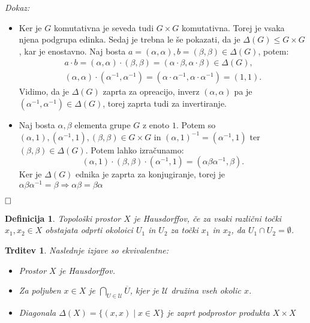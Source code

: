 \documentclass[a4paper,12pt]{article}
\def\qed{$\hfill\Box$}   %
\newtheorem{trditev}{Trditev}
\newtheorem{definicija}{Definicija}
\begin{document}
\noindent
{\em Dokaz:\/}
    \begin{itemize}
        \item[($\Rightarrow$)] Ker je $G$ komutativna je seveda tudi $G \times G$ komutativna. Torej je vsaka njena podgrupa edinka.
            Sedaj je trebna le še pokazati, da je $\Delta(G) \le G \times G$, kar je enostavno. Naj bosta $a = (\alpha, \alpha), b = (\beta, \beta) \in \Delta(G)$, potem:
            \begin{gather*}
                a \cdot b = (\alpha, \alpha) \cdot (\beta, \beta) = (\alpha \cdot \beta, \alpha \cdot \beta) \in \Delta(G), \\
                (\alpha, \alpha) \cdot (\alpha^{-1}, \alpha^{-1}) = (\alpha \cdot \alpha^{-1}, \alpha \cdot \alpha^{-1}) = (1,1).
            \end{gather*}
            Vidimo, da je $\Delta(G)$ zaprta za opreacijo, inverz $(\alpha, \alpha)$ pa je $(\alpha^{-1}, \alpha^{-1}) \in \Delta(G)$, torej zaprta tudi za invertiranje.
        \item[($\Leftarrow$)] Naj bosta $\alpha, \beta$ elementa grupe $G$ z enoto $1$.
        Potem so $(\alpha,1), (\alpha^{-1}, 1), (\beta, \beta) \in G \times G$ in
            $(\alpha,1)^{-1} = (\alpha^{-1},1)$ ter $(\beta, \beta) \in \Delta(G)$. Potem lahko izračunamo:
            \[(\alpha,1) \cdot (\beta, \beta) \cdot (\alpha^{-1}, 1) = (\alpha\beta\alpha^{-1}, \beta).\]
            Ker je $\Delta(G)$ ednika je zaprta za konjugiranje, torej je $\alpha\beta\alpha^{-1} = \beta \Rightarrow \alpha\beta = \beta\alpha$
    \end{itemize}
\qed

\begin{definicija}
    Topološki prostor $X$ je \emph{Hausdorffov}, če za vsaki različni točki $x_1, x_2 \in X$ obstajata odprti okoloici $U_1$ in $U_2$ za točki $x_1$ in $x_2$, da $U_1 \cap U_2 = \emptyset$.
\end{definicija}

\begin{trditev}
    Naslednje izjave so ekvivalentne:
    \begin{itemize}
        \item[\rm (i)] Prostor $X$ je Hausdorffov.
        \item[\rm (ii)] Za poljuben $x \in X$ je $\bigcap_{U \in \mathcal{U}} \overline{U}$, kjer je $\mathcal{U}$ družina vseh okolic $x$.
        \item[\rm (iii)] Diagonala $\Delta(X) = \{(x,x) \mid x \in X \} $ je zaprt podprostor produkta $X \times X$
    \end{itemize}
\end{trditev}
\end{document}
